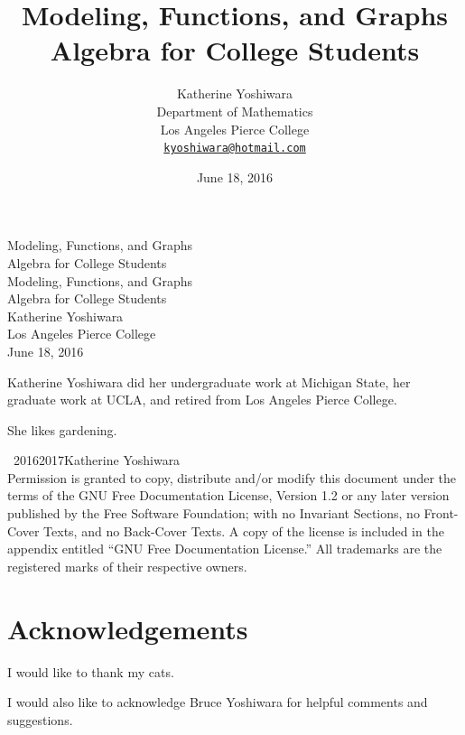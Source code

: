 \documentclass[10pt,]{book}
\title{Modeling, Functions, and Graphs\\
{\large Algebra for College Students}}
\author{Katherine Yoshiwara\\
Department of Mathematics\\
Los Angeles Pierce College\\
\href{mailto:kyoshiwara@hotmail.com}{\nolinkurl{kyoshiwara@hotmail.com}}
}
\date{June 18, 2016}
\theoremstyle{plain}
\theoremstyle{definition}
\theoremstyle{definition}
\numberwithin{equation}{section}
\begin{document}
\frontmatter
\thispagestyle{empty}
{\centering
\vspace*{0.28\textheight}
{\Huge Modeling, Functions, and Graphs}\\[2\baselineskip]
{\LARGE Algebra for College Students}\\
}
\clearpage
\thispagestyle{empty}
\null%
\clearpage
\thispagestyle{empty}
{\centering
\vspace*{0.14\textheight}
{\Huge Modeling, Functions, and Graphs}\\[\baselineskip]
{\LARGE Algebra for College Students}\\[3\baselineskip]
{\Large Katherine Yoshiwara}\\[0.5\baselineskip]
{\Large Los Angeles Pierce College}\\[3\baselineskip]
{\Large June 18, 2016}\\}
\clearpage
\thispagestyle{empty}
{\setlength{\parindent}{0pt}\setlength{\parskip}{4pt}Katherine Yoshiwara did her undergraduate work at Michigan State, her graduate work at UCLA, and retired from Los Angeles Pierce College.%
\par
She likes gardening.%
}
        \par{}
\noindent\textcopyright\ 2016\textendash{}2017\quad{}Katherine Yoshiwara\\[0.5\baselineskip]
Permission is granted to copy, distribute and/or modify this document under the terms of the GNU Free Documentation License, Version 1.2 or any later version published by the Free Software Foundation; with no Invariant Sections, no Front-Cover Texts, and no Back-Cover Texts.  A copy of the license is included in the appendix entitled ``GNU Free Documentation License.''  All trademarks\texttrademark{} are the registered\textregistered{} marks of their respective owners.\par
{}
\null\clearpage
\chapter*{Acknowledgements}\label{acknowledgement-1}
I would like to thank my cats.%
\par
I would also like to acknowledge Bruce Yoshiwara for  helpful comments and suggestions. %
\end{document}
